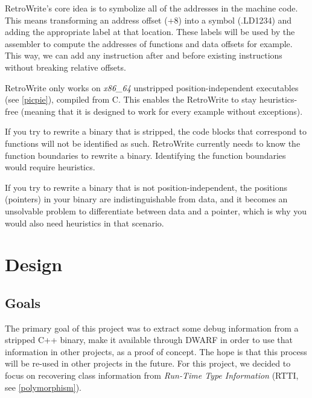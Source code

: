 \documentclass[a4paper,11pt,oneside]{report}
\newcommand{\lou}[1]{\todo[inline,color=green!40]{Louis: #1}}
\begin{document}
RetroWrite's core idea is to symbolize all of the addresses in the machine
code. This means transforming an address offset (+8) into a symbol
(.LD1234) and adding the appropriate label at that location.
These labels will be used by the assembler to compute the addresses of
functions and data offsets for example.
This way, we can add any instruction after and before existing instructions
without breaking relative offsets.

RetroWrite only works on \emph{x86\_64} unstripped position-independent
executables (see \autoref{picpie}), compiled from C.
This enables the RetroWrite to stay heuristics-free (meaning that it is
designed to work for every example without exceptions).

If you try to rewrite a binary that is stripped, the code blocks that
correspond to functions will not be identified as such.
RetroWrite currently needs to know the function boundaries to rewrite a binary.
Identifying the function boundaries would require heuristics.

If you try to rewrite a binary that is not position-independent, the
positions (pointers) in your binary are indistinguishable from data, and it
becomes an unsolvable problem to differentiate between data and a pointer,
which is why you would also need heuristics in that scenario.


\chapter{Design}




\section{Goals}
\lou{TODO rename this to dis-cover ?}

The primary goal of this project was to extract some debug information from a
stripped C++ binary, make it available through DWARF in order to use that
information in other projects, as a proof of concept.
The hope is that this process will be re-used in other projects in the future.
For this project, we decided to focus on recovering class information from
\emph{Run-Time Type Information} (RTTI, see \autoref{polymorphism}).
\end{document}

